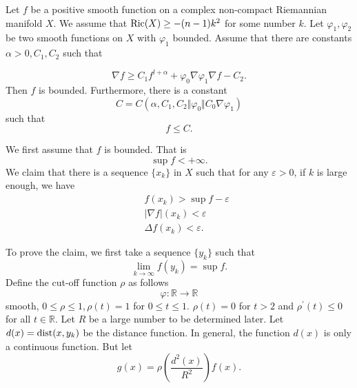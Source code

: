 \begin{theorem} Let $ f$ be a positive smooth function on a complex non-compact Riemannian manifold $X$. We assume that $ {\rm Ric} (X) \geq - (n-1) k^2 $ for some number $k$. Let $ \varphi_1, \varphi_2 $ be two smooth functions on $X$ with $ \varphi_1 $ bounded. Assume that there are constants $ \alpha > 0 , C_1, C_2 $ such that
\end{theorem}
\begin{equation} \nabla f \geq C_1 f ^{l+ \alpha} + \varphi _0 \nabla \varphi_1 \nabla f - C_2 .\tag*{$\star$} \end{equation}
%
Then $f$ is bounded. Furthermore, there is a constant 
\[
C = C (\alpha, C_1, C_2 \Vert \varphi _0 \Vert C_0 \nabla \varphi _1 ) 
\]
 such that 
%
\[ f \leq C.\]

We first assume that $ f$ is bounded. That is 
%
\[ \sup f < + \infty.\]
We claim that there is a sequence $ \{ x_k\} $ in $X$ such that for any $ \varepsilon > 0 $, if $ k$ is large enough, we have 
\begin{eqnarray*}
&&f(x_k) > \sup f - \varepsilon \\
&& | \nabla f | (x_k) < \varepsilon \\
&&\Delta f (x_k) < \varepsilon.
\end{eqnarray*}

To prove the claim, we first take a sequence $ \{ y_k\} $ such that 
%
\[ \lim_{k \rightarrow \infty}  f (y_k) = \sup f.\]
%
Define the cut-off function $ \rho $ as follows 
%
\[ \varphi : \mathbb{R} \rightarrow \mathbb{R}\]
%
smooth, $ 0 \leq \rho \leq 1, \rho (t) = 1 $ for 	 $ 0 \leq t \leq 1$. $ \rho (t) = 0 $ for $ t > 2 $ and $ \rho^\prime (t) \leq 0$ for all $ t \in \mathbb{R} $. Let $R$ be a large number to be determined later. 
Let $d(x) = {\rm dist}  (x, y_k) $ be the distance function. In general, the function $ d(x) $ is only a continuous function. But let 
%
\[ g(x) = \rho \left( \frac{d^2(x)}{R^2} \right) f (x) .\]


